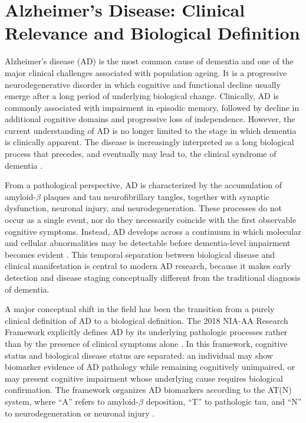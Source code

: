 % 
% 

\section{Alzheimer's Disease: Clinical Relevance and Biological Definition}

Alzheimer's disease (AD) is the most common cause of dementia and one of the major clinical challenges associated with population ageing. It is a progressive neurodegenerative disorder in which cognitive and functional decline usually emerge after a long period of underlying biological change. Clinically, AD is commonly associated with impairment in episodic memory, followed by decline in additional cognitive domains and progressive loss of independence. However, the current understanding of AD is no longer limited to the stage in which dementia is clinically apparent. The disease is increasingly interpreted as a long biological process that precedes, and eventually may lead to, the clinical syndrome of dementia \citep{scheltens2021alzheimer,jack2018nia}.

From a pathological perspective, AD is characterized by the accumulation of amyloid-\(\beta\) plaques and tau neurofibrillary tangles, together with synaptic dysfunction, neuronal injury, and neurodegeneration. These processes do not occur as a single event, nor do they necessarily coincide with the first observable cognitive symptoms. Instead, AD develops across a continuum in which molecular and cellular abnormalities may be detectable before dementia-level impairment becomes evident \citep{scheltens2021alzheimer,sperling2011preclinical}. This temporal separation between biological disease and clinical manifestation is central to modern AD research, because it makes early detection and disease staging conceptually different from the traditional diagnosis of dementia.

A major conceptual shift in the field has been the transition from a purely clinical definition of AD to a biological definition. The 2018 NIA-AA Research Framework explicitly defines AD by its underlying pathologic processes rather than by the presence of clinical symptoms alone \citep{jack2018nia}. In this framework, cognitive status and biological disease status are separated: an individual may show biomarker evidence of AD pathology while remaining cognitively unimpaired, or may present cognitive impairment whose underlying cause requires biological confirmation. The framework organizes AD biomarkers according to the AT(N) system, where ``A'' refers to amyloid-\(\beta\) deposition, ``T'' to pathologic tau, and ``N'' to neurodegeneration or neuronal injury \citep{jack2018nia}.

